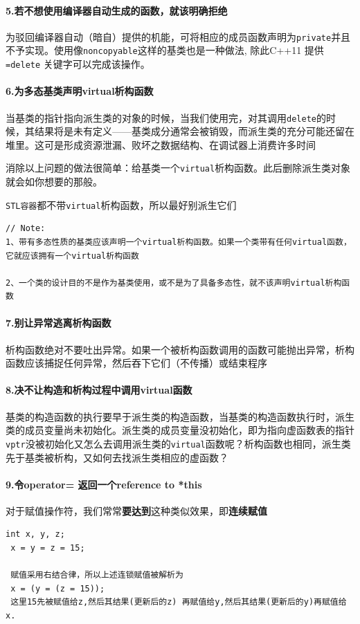 \documentclass[UTF8,a4paper,12pt]{ctexbook}
\begin{document}
		\paragraph{5.若不想使用编译器自动生成的函数，就该明确拒绝} 为驳回编译器自动（暗自）提供的机能，可将相应的成员函数声明为\verb|private|并且不予实现。使用像\verb|noncopyable|这样的基类也是一种做法, 除此C++11 提供\verb|=delete| 关键字可以完成该操作。
			
		\paragraph{6.为多态基类声明virtual析构函数} 当基类的指针指向派生类的对象的时候，当我们使用完，对其调用\verb|delete|的时候，其结果将是未有定义——基类成分通常会被销毁，而派生类的充分可能还留在堆里。这可是形成资源泄漏、败坏之数据结构、在调试器上消费许多时间
			
			消除以上问题的做法很简单：给基类一个\verb|virtual|析构函数。此后删除派生类对象就会如你想要的那般。
			
			 \verb|STL容器|都不带\verb|virtual|析构函数，所以最好别派生它们
			 
		\begin{lstlisting}[frame = lbrT,xleftmargin=.02\textwidth]
// Note:
1、带有多态性质的基类应该声明一个virtual析构函数。如果一个类带有任何virtual函数，它就应该拥有一个virtual析构函数

2、一个类的设计目的不是作为基类使用，或不是为了具备多态性，就不该声明virtual析构函数
		\end{lstlisting}
				 
		\paragraph{7.别让异常逃离析构函数} 析构函数绝对不要吐出异常。如果一个被析构函数调用的函数可能抛出异常，析构函数应该捕捉任何异常，然后吞下它们（不传播）或结束程序
		
		\paragraph{8.决不让构造和析构过程中调用virtual函数} 基类的构造函数的执行要早于派生类的构造函数，当基类的构造函数执行时，派生类的成员变量尚未初始化。派生类的成员变量没初始化，即为指向虚函数表的指针\verb|vptr|没被初始化又怎么去调用派生类的\verb|virtual|函数呢？析构函数也相同，派生类先于基类被析构，又如何去找派生类相应的虚函数？
		
		\paragraph{9.令operator= 返回一个reference to *this}
			对于赋值操作符，我们常常\textbf{要达到}这种类似效果，即\textbf{连续赋值}
			\begin{lstlisting}[xleftmargin=.04\textwidth]
 int x, y, z;
 x = y = z = 15;
 
 赋值采用右结合律，所以上述连锁赋值被解析为
 x = (y = (z = 15));
 这里15先被赋值给z,然后其结果(更新后的z) 再赋值给y,然后其结果(更新后的y)再赋值给x.
			\end{lstlisting}
			
\end{document}
